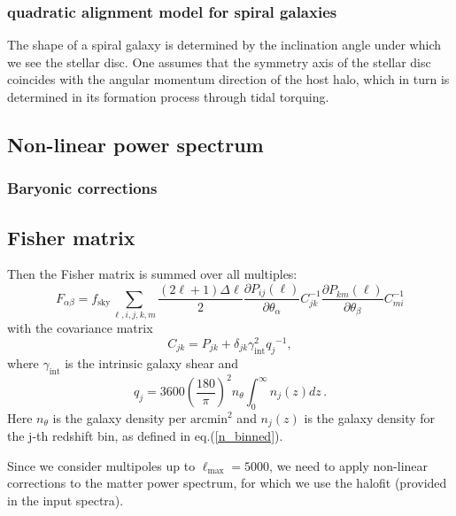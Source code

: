 \subsubsection{quadratic alignment model for spiral galaxies}
The shape of a spiral galaxy is determined by the inclination angle under which we see the stellar disc. One assumes that the symmetry axis of the stellar disc coincides with the angular momentum direction of the host halo, which in turn is determined in its formation process through tidal torquing.



\subsection{Non-linear power spectrum}


\subsubsection{Baryonic corrections}


\subsection{Fisher matrix}

Then the Fisher matrix is summed over all multiples:
\begin{equation}
F_{\alpha\beta}=f_{\mathrm{sky}}\sum\limits _{\ell,i,j,k,m}\frac{(2\ell+1)\Delta\ell}{2}\frac{\partial P_{ij}(\ell)}{\partial\theta_{\alpha}}C_{jk}^{-1}\frac{\partial P_{km}(\ell)}{\partial\theta_{\beta}}C_{mi}^{-1}\label{eq:fm-wl}
\end{equation}
 with the covariance matrix 
\begin{equation}
C_{jk}=P_{jk}+\delta_{jk}\gamma_{\mathrm{int}}^{2}{{{q}}_j}^{-1},
\end{equation}
 where $\gamma_{\mathrm{int}}$ is the
intrinsic galaxy shear  and 
\begin{equation}
q_{j} = 3600\left(\frac{180}{\pi}\right)^{2} n_{\theta} \int^\infty_0 n_j(z) dz \, .
\end{equation}
Here $n_{\theta}$ is the galaxy density per $\mathrm{arcmin}^{2}$ and $n_j(z)$ is the galaxy density for the j-th redshift bin, as defined in eq.(\ref{n_binned}).

Since we consider multipoles up to $\ell_{\mathrm{max}}=5000$,
we need to apply non-linear corrections to the matter power spectrum,
for which we use the halofit (provided in the input spectra).

